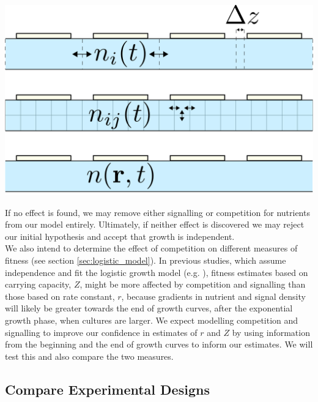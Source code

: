 \begin{Figure}
  \centering
  \includegraphics[width=\linewidth]{height_dep_miniqfa_delta_z}
  \label{fig:height_dependence}
\end{Figure}

If no effect is found, we may remove either signalling or competition
for nutrients from our model entirely. Ultimately, if neither effect
is discovered we may reject our initial hypothesis and accept that
growth is independent.
\\

We also intend to determine the effect of competition on different
measures of fitness (see section \ref{sec:logistic_model}). In
previous studies, which assume independence and fit the logistic
growth model (e.g. \citet{Addinall2011}), fitness estimates based on
carrying capacity, \(Z\), might be more affected by competition and
signalling than those based on rate constant, \(r\), because gradients
in nutrient and signal density will likely be greater towards the end
of growth curves, after the exponential growth phase, when cultures
are larger. We expect modelling competition and signalling to improve
our confidence in estimates of \(r\) and \(Z\) by using information from
the beginning and the end of growth curves to inform our estimates. We
will test this and also compare the two measures.

\subsection{Compare Experimental Designs}
\label{sec:comp-exper-designs}

